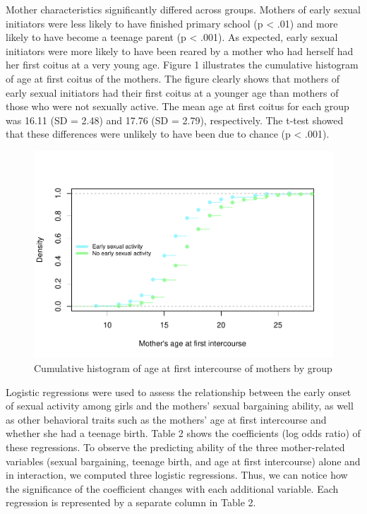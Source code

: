 \documentclass[
]{article}
\begin{document}
Mother characteristics significantly differed across groups. Mothers of
early sexual initiators were less likely to have finished primary school
(p \textless{} .01) and more likely to have become a teenage parent (p
\textless{} .001). As expected, early sexual initiators were more likely
to have been reared by a mother who had herself had her first coitus at
a very young age. Figure 1 illustrates the cumulative histogram of age
at first coitus of the mothers. The figure clearly shows that mothers of
early sexual initiators had their first coitus at a younger age than
mothers of those who were not sexually active. The mean age at first
coitus for each group was 16.11 (SD = 2.48) and 17.76 (SD = 2.79),
respectively. The t-test showed that these differences were unlikely to
have been due to chance (p \textless{} .001).

\begin{figure}

{\centering \includegraphics[width=0.8\linewidth,height=0.7\textheight]{early_sexual_activity_report_files/figure-latex/unnamed-chunk-2-1} 

}

\caption{Cumulative histogram of age at first intercourse of mothers by group}\label{fig:unnamed-chunk-2}
\end{figure}

Logistic regressions were used to assess the relationship between the
early onset of sexual activity among girls and the mothers' sexual
bargaining ability, as well as other behavioral traits such as the
mothers' age at first intercourse and whether she had a teenage birth.
Table 2 shows the coefficients (log odds ratio) of these regressions. To
observe the predicting ability of the three mother-related variables
(sexual bargaining, teenage birth, and age at first intercourse) alone
and in interaction, we computed three logistic regressions. Thus, we can
notice how the significance of the coefficient changes with each
additional variable. Each regression is represented by a separate column
in Table 2.
\end{document}
